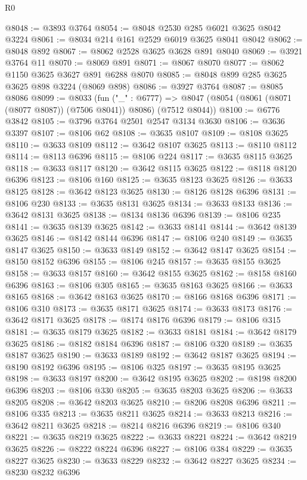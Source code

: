 \begin{lexlean}{R0}
\begin{coremodule}
@8048 := @3893 @3764
@8054 := @8048 @2530 @285 @6021 @3625 @8042 @3224
@8061 := @8034 @214 @161 @2529 @6019 @3625 @8041 @8042
@8062 := @8048 @892
@8067 := @8062 @2528 @3625 @3628 @891 @8040
@8069 := @3921 @3764 @11
@8070 := @8069 @891
@8071 := @8067 @8070
@8077 := @8062 @1150 @3625 @3627 @891 @6288 @8070
@8085 := @8048 @899 @285 @3625 @3625 @898 @3224 (@8069 @898)
@8086 := @3927 @3764
@8087 := @8085 @8086
@8099 := @8033
    (fun ("_" : @6777) =>
    @8047 (@8054 (@8061 (@8071 (@8077 @8087)) (@7506 @8041)) @8086) (@7512 @8044))
@8100 := @6776 @3842
@8105 := @3796 @3764 @2501 @2547 @3134 @3630
@8106 := @3636 @3397
@8107 := @8106 @62
@8108 := @3635 @8107
@8109 := @8108 @3625
@8110 := @3633 @8109
@8112 := @3642 @8107 @3625
@8113 := @8110 @8112
@8114 := @8113 @6396
@8115 := @8106 @224
@8117 := @3635 @8115 @3625
@8118 := @3633 @8117
@8120 := @3642 @8115 @3625
@8122 := @8118 @8120 @6396
@8123 := @8106 @160
@8125 := @3635 @8123 @3625
@8126 := @3633 @8125
@8128 := @3642 @8123 @3625
@8130 := @8126 @8128 @6396
@8131 := @8106 @230
@8133 := @3635 @8131 @3625
@8134 := @3633 @8133
@8136 := @3642 @8131 @3625
@8138 := @8134 @8136 @6396
@8139 := @8106 @235
@8141 := @3635 @8139 @3625
@8142 := @3633 @8141
@8144 := @3642 @8139 @3625
@8146 := @8142 @8144 @6396
@8147 := @8106 @240
@8149 := @3635 @8147 @3625
@8150 := @3633 @8149
@8152 := @3642 @8147 @3625
@8154 := @8150 @8152 @6396
@8155 := @8106 @245
@8157 := @3635 @8155 @3625
@8158 := @3633 @8157
@8160 := @3642 @8155 @3625
@8162 := @8158 @8160 @6396
@8163 := @8106 @305
@8165 := @3635 @8163 @3625
@8166 := @3633 @8165
@8168 := @3642 @8163 @3625
@8170 := @8166 @8168 @6396
@8171 := @8106 @310
@8173 := @3635 @8171 @3625
@8174 := @3633 @8173
@8176 := @3642 @8171 @3625
@8178 := @8174 @8176 @6396
@8179 := @8106 @315
@8181 := @3635 @8179 @3625
@8182 := @3633 @8181
@8184 := @3642 @8179 @3625
@8186 := @8182 @8184 @6396
@8187 := @8106 @320
@8189 := @3635 @8187 @3625
@8190 := @3633 @8189
@8192 := @3642 @8187 @3625
@8194 := @8190 @8192 @6396
@8195 := @8106 @325
@8197 := @3635 @8195 @3625
@8198 := @3633 @8197
@8200 := @3642 @8195 @3625
@8202 := @8198 @8200 @6396
@8203 := @8106 @330
@8205 := @3635 @8203 @3625
@8206 := @3633 @8205
@8208 := @3642 @8203 @3625
@8210 := @8206 @8208 @6396
@8211 := @8106 @335
@8213 := @3635 @8211 @3625
@8214 := @3633 @8213
@8216 := @3642 @8211 @3625
@8218 := @8214 @8216 @6396
@8219 := @8106 @340
@8221 := @3635 @8219 @3625
@8222 := @3633 @8221
@8224 := @3642 @8219 @3625
@8226 := @8222 @8224 @6396
@8227 := @8106 @384
@8229 := @3635 @8227 @3625
@8230 := @3633 @8229
@8232 := @3642 @8227 @3625
@8234 := @8230 @8232 @6396

\end{coremodule}
\end{lexlean}
